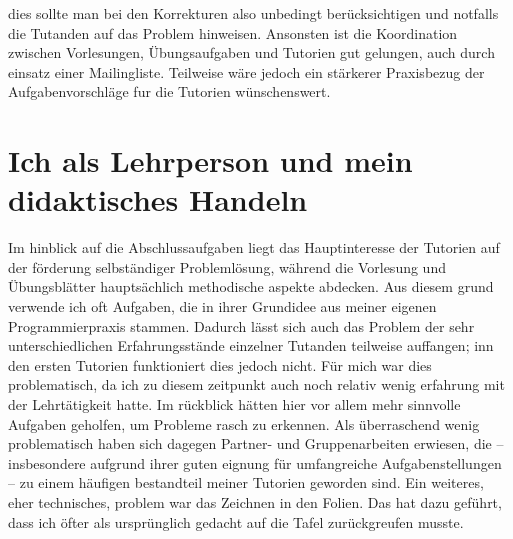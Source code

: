 \documentclass[%
fontsize=12pt,
paper=a4,
oneside,
DIV=11,
BCOR=0cm,
pagesize=automedia,
parskip=false,
headings=normal,
titlepage=true%
]{scrartcl}
\begin{document}
dies sollte man bei den Korrekturen also unbedingt ber\"{u}cksichtigen und notfalls die Tutanden auf das Problem hinweisen.
Ansonsten ist die Koordination zwischen Vorlesungen, \"{U}bungsaufgaben und Tutorien gut gelungen, auch durch einsatz einer
Mailingliste. Teilweise w\"{a}re jedoch ein st\"{a}rkerer Praxisbezug der Aufgabenvorschl\"{a}ge fur die Tutorien
w\"{u}nschenswert.

\section{Ich als Lehrperson und mein didaktisches Handeln}
Im hinblick auf die Abschlussaufgaben liegt das Hauptinteresse der Tutorien auf der f\"{o}rderung selbst\"{a}ndiger
Probleml\"{o}sung, w\"{a}hrend die Vorlesung und \"{U}bungsbl\"{a}tter haupts\"{a}chlich methodische aspekte abdecken.
Aus diesem grund verwende ich oft Aufgaben, die in ihrer Grundidee aus meiner eigenen Programmierpraxis stammen.
Dadurch l\"{a}sst sich auch das Problem der sehr unterschiedlichen Erfahrungsst\"{a}nde einzelner Tutanden teilweise
auffangen; inn den ersten Tutorien funktioniert dies jedoch nicht. F\"{u}r mich war dies problematisch, da ich zu diesem
zeitpunkt auch noch relativ wenig erfahrung mit der Lehrt\"{a}tigkeit hatte. Im r\"{u}ckblick h\"{a}tten hier vor allem mehr sinnvolle
Aufgaben geholfen, um Probleme rasch zu erkennen. Als \"{u}berraschend wenig problematisch haben sich dagegen Partner- und
Gruppenarbeiten erwiesen, die -- insbesondere aufgrund ihrer guten eignung f\"{u}r umfangreiche Aufgabenstellungen -- zu
einem h\"{a}ufigen bestandteil meiner Tutorien geworden sind. Ein weiteres, eher technisches, problem war das Zeichnen in den
Folien. Das hat dazu gef\"{u}hrt, dass ich \"{o}fter als urspr\"{u}nglich gedacht auf die Tafel zur\"{u}ckgreufen musste.
\end{document}
